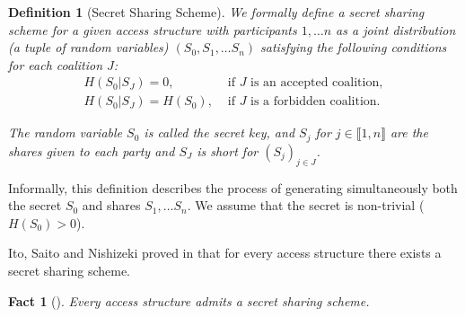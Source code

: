 \documentclass[11pt, a4paper]{kybernetika}
\newtheorem{fact}[theorem]{Fact}
\newtheorem{definition}[theorem]{Definition}
\begin{document}
	\begin{definition}[Secret Sharing Scheme]\label{def:SSS}
		We formally define a \emph{secret sharing scheme} for a given access structure with participants $1,\ldots n$ as a joint distribution (a tuple of random variables) $(S_0,S_1,\ldots S_n)$ satisfying the following conditions for each coalition $J$:
		\begin{equation}\label{eq:secret-sharing}
			\begin{array}{ll}
				H(S_0|S_J)=0,&\text{ if }J\text{ is an accepted coalition},\\
				H(S_0|S_J)=H(S_0),&\text{ if }J\text{ is a forbidden coalition}.
			\end{array}
		\end{equation}
		
		The random variable $S_0$ is called the \emph{secret key}, and $S_j$ for $j\in\llbracket1,n\rrbracket$ are the \emph{shares} given to each party and $S_J$ is short for $(S_j)_{j\in J}$.
	\end{definition}			
	
	Informally, this definition describes the process of generating simultaneously both the secret $S_0$ and shares $S_1,\ldots S_n$. We assume that the secret is non-trivial ($H(S_0)>0$).
	
	\smallskip
	
	Ito, Saito and Nishizeki proved in \cite{ito1989secret} that for every access structure there exists a secret sharing scheme.
	
	\begin{fact}[\cite{ito1989secret}]\label{prop-all-sss-acc-str}
		Every access structure admits a secret sharing scheme.
	\end{fact}
	
	
\end{document}
